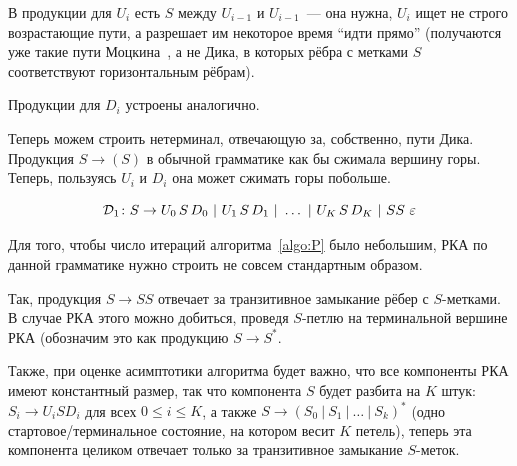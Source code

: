 В продукции для $U_i$ есть $S$ между $U_{i-1}$ и $U_{i-1}$~--- она нужна, $U_i$ ищет не строго возрастающие пути, а разрешает им некоторое время ``идти прямо'' (получаются уже такие пути Моцкина~\cite{Donaghey1977}, а не Дика, в которых рёбра с метками $S$ соответствуют горизонтальным рёбрам).

Продукции для $D_i$ устроены аналогично.

Теперь можем строить нетерминал, отвечающую за, собственно, пути Дика. Продукция $S \to ( S )$ в обычной грамматике как бы сжимала вершину горы. Теперь, пользуясь $U_i$ и $D_i$ она может сжимать горы побольше.

\begin{equation}\label{eq:S}
  \mathcal{D}_1 \colon S \rightarrow U_0\, S\, D_0~|~U_1\, S\, D_1~|~ \dots ~|~U_K\, S\, D_K~|~SS~\varepsilon
\end{equation}

Для того, чтобы число итераций алгоритма~\ref{algo:P} было небольшим, РКА по данной грамматике нужно строить не совсем стандартным образом.

Так, продукция $S \to SS$ отвечает за транзитивное замыкание рёбер с $S$-метками. В случае РКА этого можно добиться, проведя $S$-петлю на терминальной вершине РКА (обозначим это как продукцию $S \to S^*$.

Также, при оценке асимптотики алгоритма будет важно, что все компоненты РКА имеют константный размер, так что компонента $S$ будет разбита на $K$ штук: $S_i \to U_i S D_i$ для всех $0 \le i \le K$, а также $S \to (S_0~|~S_1~|~ \dots ~|~ S_k)^*$ (одно стартовое/терминальное состояние, на котором весит $K$ петель), теперь эта компонента целиком отвечает только за транзитивное замыкание $S$-меток.

